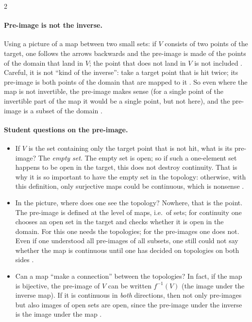 \begin{paracol}{2}
\paragraph{Pre-image is not the inverse.} Using a picture of a map between two small sets: if $V$ consists of two points of the target, one follows the
arrows backwards and the pre-image is made of the points of the domain that land in $V$; the point that does not land in $V$ is not
included . Careful, it is not ``kind of the inverse'': take a target point
that is hit twice; its pre-image is both points of the domain that are mapped to it . So even where the map is not
invertible, the pre-image makes sense (for a single point of the invertible part of the map it would be a single point, but not here), and the pre-image
is a subset of the domain .

\paragraph{Student questions on the pre-image.}
\begin{itemize}
  \item If $V$ is the set containing only the target point that is not hit, what is its pre-image? The \emph{empty set}. The empty set is open; so
        if such a one-element set happens to be open in the target, this does not destroy continuity. That is why it is so important to have the
        empty set in the topology: otherwise, with this definition, only surjective maps could be continuous, which is nonsense
        .
  \item In the picture, where does one see the topology? Nowhere, that is the point. The pre-image is defined at the level of maps, i.e.\ of sets; for continuity one
        chooses an open set in the target and checks whether it is open in the domain. For this one needs the topologies; for the pre-images one does not.
        Even if one understood all pre-images of all subsets, one still could not say whether the map is continuous until one has decided on topologies on both sides
        .
  \item Can a map ``make a connection'' between the topologies? In fact, if the map is bijective, the pre-image of $V$ can be written $f^{-1}(V)$ (the image under the inverse map).
        If it is continuous in \emph{both} directions, then not only pre-images but also images of open sets are open, since the pre-image under the inverse is the image under the
        map .
\end{itemize}


\end{paracol}
